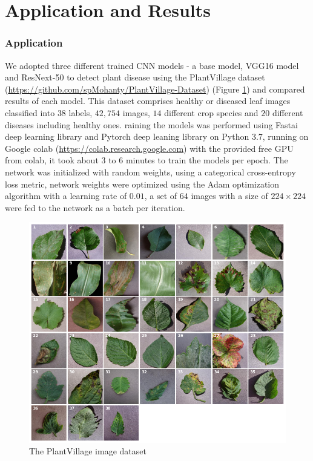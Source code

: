 \documentclass{beamer}
\begin{document}
\section{Application and Results}
\begin{frame}[allowframebreaks]
\frametitle{Application }
We adopted three different trained CNN models - a base model, VGG16 model and ResNext-50 to detect plant disease using the PlantVillage dataset (\url{https://github.com/spMohanty/PlantVillage-Dataset}) (Figure \ref{fig:data}) and compared results of each model. This dataset comprises healthy  or diseased leaf images classified into $38$ labels, $42,754$ images, $14$ different crop species and $20$ different diseases including healthy ones. raining the models was performed using Fastai deep learning library {\cite{Howard_2020}} and Pytorch deep leaning library {\cite{NEURIPS2019_9015}} on Python $3.7$, running on Google colab (\url{https://colab.research.google.com}) with the provided free GPU from colab, it took about $3$ to $6$ minutes to train the models per epoch. The network was initialized with random weights, using a categorical cross-entropy loss metric, network weights were optimized using the Adam optimization algorithm with a learning rate of $0.01$, a set of $64$ images with a size of $224 \times 224$ were fed to the network as a batch per iteration.
\begin{figure}[H]
\centering
\includegraphics[scale=0.25]{png/image_per_specie.png}
\caption{The PlantVillage image dataset}
\label{fig:data}

\end{figure}
\end{frame}
\end{document}
